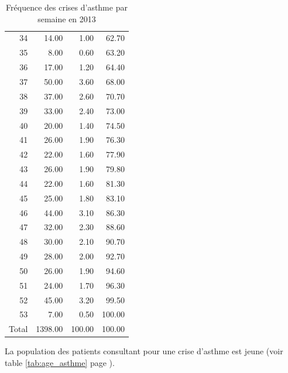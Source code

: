 \documentclass[12pt,english,french,twoside]{book}\usepackage[]{graphicx}\usepackage[]{color}
\begin{document}
\begin{table}[ht]
\begin{tabular}{rrrr}
  34 & 14.00 & 1.00 & 62.70 \\ 
  35 & 8.00 & 0.60 & 63.20 \\ 
  36 & 17.00 & 1.20 & 64.40 \\ 
  37 & 50.00 & 3.60 & 68.00 \\ 
  38 & 37.00 & 2.60 & 70.70 \\ 
  39 & 33.00 & 2.40 & 73.00 \\ 
  40 & 20.00 & 1.40 & 74.50 \\ 
  41 & 26.00 & 1.90 & 76.30 \\ 
  42 & 22.00 & 1.60 & 77.90 \\ 
  43 & 26.00 & 1.90 & 79.80 \\ 
  44 & 22.00 & 1.60 & 81.30 \\ 
  45 & 25.00 & 1.80 & 83.10 \\ 
  46 & 44.00 & 3.10 & 86.30 \\ 
  47 & 32.00 & 2.30 & 88.60 \\ 
  48 & 30.00 & 2.10 & 90.70 \\ 
  49 & 28.00 & 2.00 & 92.70 \\ 
  50 & 26.00 & 1.90 & 94.60 \\ 
  51 & 24.00 & 1.70 & 96.30 \\ 
  52 & 45.00 & 3.20 & 99.50 \\ 
  53 & 7.00 & 0.50 & 100.00 \\ 
    Total & 1398.00 & 100.00 & 100.00 \\ 
   \hline
\end{tabular}
\caption[Fréquence des crises d'asthme]{Fréquence des crises d'asthme par semaine en 2013} 
\label{tab:freq_asthme}
\end{table}




La population des patients consultant pour une crise d’asthme est jeune (voir table \ref{tab:age_asthme} page \pageref{tab:age_asthme}).
\end{document}
